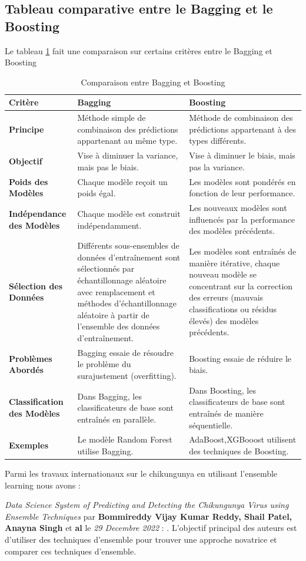 \subsection{Tableau comparative entre le Bagging et le Boosting}
Le tableau \ref{tab:bagging_vs_boosting} fait une comparaison sur certains critères entre le Bagging et Boosting
\begin{table}[h!]
	\centering
	\caption{Comparaison entre Bagging et Boosting}
	\begin{tabular}{|p{}|p{}|p{}|}
		\hline
		\textbf{Critère} & \textbf{Bagging} & \textbf{Boosting} \\
		\hline
		\textbf{Principe} & Méthode simple de combinaison des prédictions appartenant au même type. & Méthode de combinaison des prédictions appartenant à des types différents. \\
		\hline
		\textbf{Objectif} & Vise à diminuer la variance, mais pas le biais. & Vise à diminuer le biais, mais pas la variance. \\
		\hline
		\textbf{Poids des Modèles} & Chaque modèle reçoit un poids égal. & Les modèles sont pondérés en fonction de leur performance. \\
		\hline
		\textbf{Indépendance des Modèles} & Chaque modèle est construit indépendamment. & Les nouveaux modèles sont influencés par la performance des modèles précédents. \\
		\hline
		\textbf{Sélection des Données} & Différents sous-ensembles de données d'entraînement sont sélectionnés par échantillonnage aléatoire avec remplacement et méthodes d'échantillonnage aléatoire à partir de l'ensemble des données d'entraînement. & Les modèles sont entraînés de manière itérative, chaque nouveau modèle se concentrant sur la correction des erreurs (mauvais classifications ou résidus élevés) des modèles précédents. \\
		\hline
		\textbf{Problèmes Abordés} & Bagging essaie de résoudre le problème du surajustement (overfitting). & Boosting essaie de réduire le biais. \\
		\hline
		\textbf{Classification des Modèles} & Dans Bagging, les classificateurs de base sont entraînés en parallèle. & Dans Boosting, les classificateurs de base sont entraînés de manière séquentielle. \\
		\hline
		\textbf{Exemples} & Le modèle Random Forest utilise Bagging. & AdaBoost,XGBooost utilisent des techniques de Boosting. \\
		\hline
	\end{tabular}
	\label{tab:bagging_vs_boosting}
\end{table}

Parmi les travaux internationaux sur le chikungunya en utilisant l'ensemble learning nous avons : 

 \textit{Data Science System of Predicting and Detecting the Chikungunya Virus using Ensemble Techniques} par \textbf{Bommireddy Vijay Kumar Reddy, Shail Patel, Anayna Singh } et \textbf{al} le \textit{29 Decembre 2022} : . L'objectif principal des auteurs est d'utiliser des techniques d'ensemble pour trouver une approche novatrice et comparer ces techniques d'ensemble.
 
